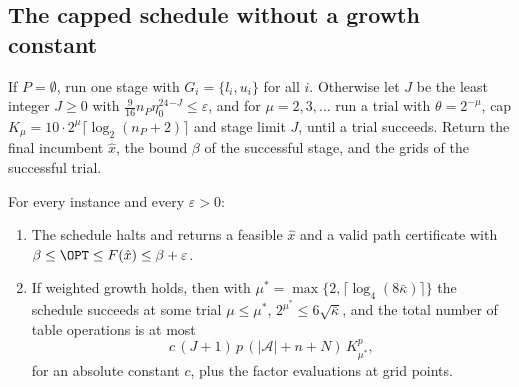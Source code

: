 \subsection{The capped schedule without a growth constant}\label{core:sec:schedule}

\begin{definition}[Schedule]\label{core:def:schedule}
If $P=\emptyset$, run one stage with $G_i=\{l_i,u_i\}$ for all $i$. Otherwise
let $J$ be the least integer $J\ge0$ with
$\frac9{16}n_P\eta_0^24^{-J}\le\varepsilon$, and for $\mu=2,3,\dots$ run a
trial with $\theta=2^{-\mu}$, cap $K_\mu=10\cdot2^\mu\lceil\log_2(n_P+2)\rceil$
and stage limit $J$, until a trial succeeds. Return the final incumbent
$\hat x$, the bound $\beta$ of the successful stage, and the grids of the
successful trial.
\end{definition}

\begin{theorem}\label{core:thm:schedule}
For every instance and every $\varepsilon>0$:
\begin{enumerate}
\item[(a)] The schedule halts and returns a feasible $\hat x$ and a valid path
certificate with $\beta\le\OPT\le F(\hat x)\le\beta+\varepsilon$.
\item[(b)] If weighted growth holds, then with
$\mu^*=\max\{2,\lceil\log_4(8\bar\kappa)\rceil\}$ the schedule succeeds at
some trial $\mu\le\mu^*$, $2^{\mu^*}\le6\sqrt{\bar\kappa}$, and the total
number of table operations is at most
\[
c\,(J+1)\,p\,(|\mathcal A|+n+N)\,K_{\mu^*}^p,
\]
for an absolute constant $c$, plus the factor evaluations at grid points.
\end{enumerate}
\end{theorem}

